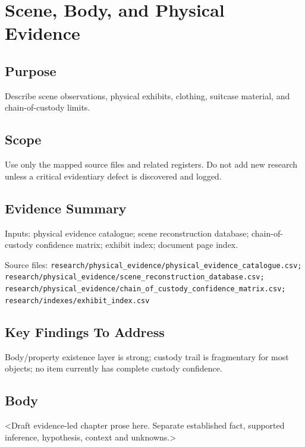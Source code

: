 
\chapter{Scene, Body, and Physical Evidence}
\label{chap:05-scene-forensics}


\section{Purpose}
Describe scene observations, physical exhibits, clothing, suitcase material, and chain-of-custody limits.

\section{Scope}
Use only the mapped source files and related registers. Do not add new research unless a critical evidentiary defect is discovered and logged.

\section{Evidence Summary}
Inputs: physical evidence catalogue; scene reconstruction database; chain-of-custody confidence matrix; exhibit index; document page index.

Source files: \texttt{research/physical_evidence/physical_evidence_catalogue.csv; research/physical_evidence/scene_reconstruction_database.csv; research/physical_evidence/chain_of_custody_confidence_matrix.csv; research/indexes/exhibit_index.csv}

\section{Key Findings To Address}
Body/property existence layer is strong; custody trail is fragmentary for most objects; no item currently has complete custody confidence.

\section{Body}
<Draft evidence-led chapter prose here. Separate established fact, supported inference, hypothesis, context and unknowns.>

